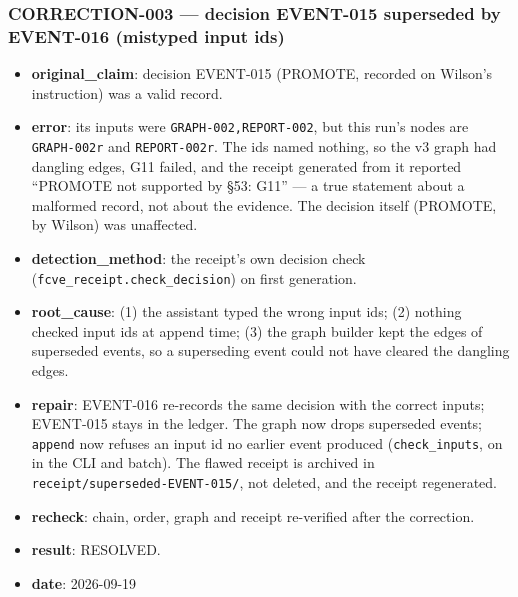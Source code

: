\documentclass[11pt]{article}
\begin{document}
\subsubsection*{CORRECTION-003 --- decision EVENT-015 superseded by EVENT-016 (mistyped input ids)}
\begin{itemize}
\item \textbf{original\_claim}: decision EVENT-015 (PROMOTE, recorded on Wilson's instruction) was a valid record.
\item \textbf{error}: its inputs were \texttt{GRAPH-002,REPORT-002}, but this run's nodes are \texttt{GRAPH-002r} and \texttt{REPORT-002r}. The ids named nothing, so the v3 graph had dangling edges, G11 failed, and the receipt generated from it reported ``PROMOTE not supported by \S{}53: G11'' --- a true statement about a malformed record, not about the evidence. The decision itself (PROMOTE, by Wilson) was unaffected.
\item \textbf{detection\_method}: the receipt's own decision check (\texttt{fcve\_receipt.check\_decision}) on first generation.
\item \textbf{root\_cause}: (1) the assistant typed the wrong input ids; (2) nothing checked input ids at append time; (3) the graph builder kept the edges of superseded events, so a superseding event could not have cleared the dangling edges.
\item \textbf{repair}: EVENT-016 re-records the same decision with the correct inputs; EVENT-015 stays in the ledger. The graph now drops superseded events; \texttt{append} now refuses an input id no earlier event produced (\texttt{check\_inputs}, on in the CLI and batch). The flawed receipt is archived in \texttt{receipt/superseded-EVENT-015/}, not deleted, and the receipt regenerated.
\item \textbf{recheck}: chain, order, graph and receipt re-verified after the correction.
\item \textbf{result}: RESOLVED.
\item \textbf{date}: 2026-09-19
\end{itemize}
\end{document}
